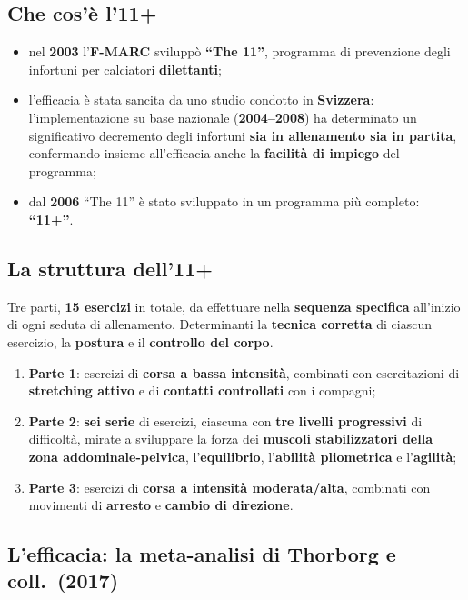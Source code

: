 \subsection{Che cos'è l'11+}

\begin{itemize}
  \item nel \textbf{2003} l'\textbf{F-MARC} sviluppò \textbf{``The 11''}, programma di prevenzione
    degli infortuni per calciatori \textbf{dilettanti};
  \item l'efficacia è stata sancita da uno studio condotto in \textbf{Svizzera}:
    l'implementazione su base nazionale (\textbf{2004--2008}) ha determinato un significativo
    decremento degli infortuni \textbf{sia in allenamento sia in partita}, confermando insieme
    all'efficacia anche la \textbf{facilità di impiego} del programma;
  \item dal \textbf{2006} ``The 11'' è stato sviluppato in un programma più completo:
    \textbf{``11+''}.
\end{itemize}

\subsection{La struttura dell'11+}

Tre parti, \textbf{15 esercizi} in totale, da effettuare nella \textbf{sequenza specifica}
all'inizio di ogni seduta di allenamento. Determinanti la \textbf{tecnica corretta} di ciascun
esercizio, la \textbf{postura} e il \textbf{controllo del corpo}.

\begin{enumerate}
  \item \textbf{Parte 1}: esercizi di \textbf{corsa a bassa intensità}, combinati con esercitazioni
    di \textbf{stretching attivo} e di \textbf{contatti controllati} con i compagni;
  \item \textbf{Parte 2}: \textbf{sei serie} di esercizi, ciascuna con \textbf{tre livelli
    progressivi} di difficoltà, mirate a sviluppare la forza dei \textbf{muscoli stabilizzatori
    della zona addominale-pelvica}, l'\textbf{equilibrio}, l'\textbf{abilità pliometrica} e
    l'\textbf{agilità};
  \item \textbf{Parte 3}: esercizi di \textbf{corsa a intensità moderata/alta}, combinati con
    movimenti di \textbf{arresto} e \textbf{cambio di direzione}.
\end{enumerate}

\subsection{L'efficacia: la meta-analisi di Thorborg e coll.\ (2017)}

